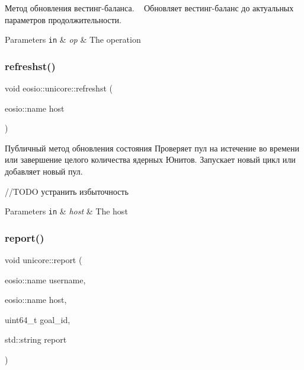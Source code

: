 Метод обновления вестинг-\/баланса. ~\newline
Обновляет вестинг-\/баланс до актуальных параметров продолжительности. 


\begin{DoxyParams}[1]{Parameters}
\mbox{\tt in}  & {\em op} & The operation \\
\hline
\end{DoxyParams}
\mbox{\label{classeosio_1_1unicore_a9ba153178009033b25fdd4db4c36e02e}} 
\subsubsection{\texorpdfstring{refreshst()}{refreshst()}}
{\footnotesize\ttfamily void eosio\+::unicore\+::refreshst (\begin{DoxyParamCaption}\item[{eosio\+::name}]{host }\end{DoxyParamCaption})}



Публичный метод обновления состояния Проверяет пул на истечение во времени или завершение целого количества ядерных Юнитов. Запускает новый цикл или добавляет новый пул. 

//\+T\+O\+DO устранить избыточность


\begin{DoxyParams}[1]{Parameters}
\mbox{\tt in}  & {\em host} & The host \\
\hline
\end{DoxyParams}
\mbox{\label{classeosio_1_1unicore_ac0e6bf94b8bfd28e08c364631a357d91}} 
\subsubsection{\texorpdfstring{report()}{report()}}
{\footnotesize\ttfamily void unicore\+::report (\begin{DoxyParamCaption}\item[{eosio\+::name}]{username,  }\item[{eosio\+::name}]{host,  }\item[{uint64\+\_\+t}]{goal\+\_\+id,  }\item[{std\+::string}]{report }\end{DoxyParamCaption})}



